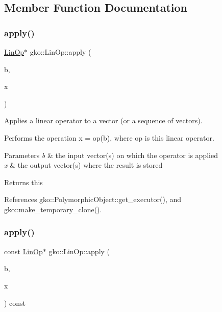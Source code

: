 \subsection{Member Function Documentation}
\mbox{\label{classgko_1_1LinOp_a0449b2fc705d2f970855af23b5e2788e}} 
\subsubsection{\texorpdfstring{apply()}{apply()}\hspace{0.1cm}{\footnotesize\ttfamily [1/4]}}
{\footnotesize\ttfamily \hyperlink{classgko_1_1LinOp}{Lin\+Op}$\ast$ gko\+::\+Lin\+Op\+::apply (\begin{DoxyParamCaption}\item[{const \hyperlink{classgko_1_1LinOp}{Lin\+Op} $\ast$}]{b,  }\item[{\hyperlink{classgko_1_1LinOp}{Lin\+Op} $\ast$}]{x }\end{DoxyParamCaption})}



Applies a linear operator to a vector (or a sequence of vectors). 

Performs the operation x = op(b), where op is this linear operator.


\begin{DoxyParams}{Parameters}
{\em b} & the input vector(s) on which the operator is applied \\
\hline
{\em x} & the output vector(s) where the result is stored\\
\hline
\end{DoxyParams}
\begin{DoxyReturn}{Returns}
this 
\end{DoxyReturn}


References gko\+::\+Polymorphic\+Object\+::get\+\_\+executor(), and gko\+::make\+\_\+temporary\+\_\+clone().

\mbox{\label{classgko_1_1LinOp_a74afc0e94716dbf4f3e1d7182e37456f}} 
\subsubsection{\texorpdfstring{apply()}{apply()}\hspace{0.1cm}{\footnotesize\ttfamily [2/4]}}
{\footnotesize\ttfamily const \hyperlink{classgko_1_1LinOp}{Lin\+Op}$\ast$ gko\+::\+Lin\+Op\+::apply (\begin{DoxyParamCaption}\item[{const \hyperlink{classgko_1_1LinOp}{Lin\+Op} $\ast$}]{b,  }\item[{\hyperlink{classgko_1_1LinOp}{Lin\+Op} $\ast$}]{x }\end{DoxyParamCaption}) const}



